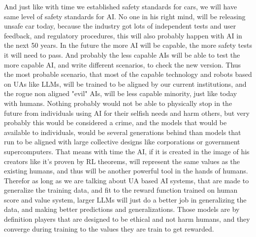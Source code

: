 \documentclass{article}
\begin{document}
And just like with time we established safety standards for cars, we will have same level of safety standards for AI. No one in his right mind, will be releasing unsafe car today, because the industry got lots of independent tests and user feedback, and regulatory procedures, this will also probably happen with AI in the next 50 years. In the future the more AI will be capable, the more safety tests it will need to pass. And probably the less capable AIs will be able to test the more capable AI, and write different scenarios, to check the new version. Thus the most probable scenario, that most of the capable technology and robots based on UAs like LLMs, will be trained to be aligned by our current institutions, and the rogue non aligned "evil" AIs, will be less capable minority, just like today with humans. Nothing probably would not be able to physically stop in the future from individuals using AI for their selfish needs and harm others, but very probably this would be considered a crime, and the models that would be available to individuals, would be several generations behind than models that run to be aligned with large collective designs like corporations or government supercomputers. That means with time the AI, if it is created in the image of his creators like it's proven by RL theorems, will represent the same values as the existing humans, and thus will be another powerful tool in the hands of humans.\\

Therefor as long as we are talking about UA based AI systems, that are made to generalize the training data, and fit to the reward function trained on human score and value system\cite{chatgpt}, larger LLMs will just do a better job in generalizing the data, and making better predictions and generalizations. Those models are by definition players that are designed to be ethical and not harm humans, and they converge during training to the values they are train to get rewarded\cite{zhu2023principled}.\\
\end{document}
